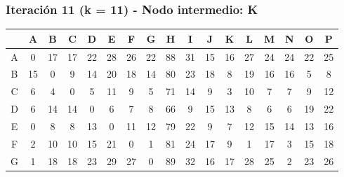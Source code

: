 \documentclass[12pt]{article}
\begin{document}
\subsubsection{Iteración 11 (k = 11) - Nodo intermedio: K}
\begin{table}[h!]
\centering
\begin{tabular}{|c|c|c|c|c|c|c|c|c|c|c|c|c|c|c|c|c|}
\hline
 & A & B & C & D & E & F & G & H & I & J & K & L & M & N & O & P \\\hline
A & 0 & \cellcolor{lightgreen} 17 & \cellcolor{lightgreen} 17 & \cellcolor{lightgreen} 22 & \cellcolor{lightgreen} 28 & \cellcolor{lightgreen} 26 & \cellcolor{lightgreen} 22 & \cellcolor{lightgreen} 88 & \cellcolor{lightgreen} 31 & 15 & 16 & \cellcolor{lightgreen} 27 & \cellcolor{lightgreen} 24 & \cellcolor{lightgreen} 24 & \cellcolor{lightgreen} 22 & \cellcolor{lightgreen} 25 \\\hline
B & \cellcolor{lightgreen} 15 & 0 & \cellcolor{lightgreen} 9 & \cellcolor{lightgreen} 14 & \cellcolor{lightgreen} 20 & \cellcolor{lightgreen} 18 & \cellcolor{lightgreen} 14 & \cellcolor{lightgreen} 80 & \cellcolor{lightgreen} 23 & \cellcolor{lightgreen} 18 & 8 & \cellcolor{lightgreen} 19 & \cellcolor{lightgreen} 16 & \cellcolor{lightgreen} 16 & 5 & 8 \\\hline
C & 6 & \cellcolor{lightgreen} 4 & 0 & 5 & 11 & 9 & 5 & 71 & 14 & 9 & 3 & 10 & 7 & 7 & \cellcolor{lightgreen} 9 & \cellcolor{lightgreen} 12 \\\hline
D & 6 & \cellcolor{lightgreen} 14 & \cellcolor{lightgreen} 14 & 0 & 6 & 7 & 8 & 66 & 9 & 15 & 13 & 8 & 6 & 6 & \cellcolor{lightgreen} 19 & \cellcolor{lightgreen} 22 \\\hline
E & 0 & \cellcolor{lightgreen} 8 & \cellcolor{lightgreen} 8 & \cellcolor{lightgreen} 13 & 0 & 11 & 12 & \cellcolor{lightgreen} 79 & \cellcolor{lightgreen} 22 & 9 & 7 & 12 & \cellcolor{lightgreen} 15 & 14 & \cellcolor{lightgreen} 13 & \cellcolor{lightgreen} 16 \\\hline
F & 2 & \cellcolor{lightgreen} 10 & \cellcolor{lightgreen} 10 & \cellcolor{lightgreen} 15 & \cellcolor{lightgreen} 21 & 0 & 1 & \cellcolor{lightgreen} 81 & \cellcolor{lightgreen} 24 & 17 & 9 & 1 & \cellcolor{lightgreen} 17 & 3 & \cellcolor{lightgreen} 15 & \cellcolor{lightgreen} 18 \\\hline
G & 1 & \cellcolor{lightgreen} 18 & \cellcolor{lightgreen} 18 & \cellcolor{lightgreen} 23 & \cellcolor{lightgreen} 29 & \cellcolor{lightgreen} 27 & 0 & \cellcolor{lightgreen} 89 & \cellcolor{lightgreen} 32 & 16 & 17 & \cellcolor{lightgreen} 28 & \cellcolor{lightgreen} 25 & 2 & \cellcolor{lightgreen} 23 & \cellcolor{lightgreen} 26 \\\hline

\end{tabular}
\end{table}
\end{document}
